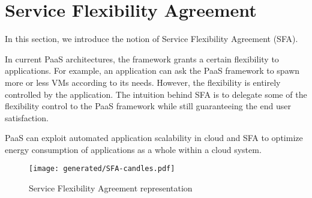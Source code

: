 \section{Service Flexibility Agreement}
\label{sec:sfa}

In this section, we introduce the notion of Service Flexibility Agreement (SFA). 

In current PaaS architectures, the framework grants a certain flexibility to applications.
For example, an application can ask the PaaS framework to spawn more or less VMs according to its needs.
However, the flexibility is entirely controlled by the application.
The intuition behind SFA is to delegate some of the flexibility control to the PaaS framework while still guaranteeing the end user satisfaction.





 
PaaS can exploit automated application scalability in cloud and SFA to optimize energy consumption of applications as a whole within a cloud system.

\begin{figure}[h]
\centering
\texttt{[image: generated/SFA-candles.pdf]}
\caption{Service Flexibility Agreement representation}
\label{fig:EASC}
\end{figure}

